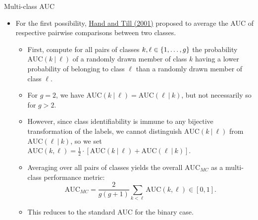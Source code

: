 \documentclass[11pt,compress,t,notes=noshow, xcolor=table]{beamer}
\begin{document}
\begin{vbframe}{Multi-class AUC}
\framebreak
  
\begin{itemize}  
  \small
  \item For the first possibility, 
  \href{https://link.springer.com/article/10.1023/A:1010920819831}
  {Hand and Till (2001)} proposed to average the AUC of respective pairwise 
  comparisons between two classes.
  \begin{itemize}
    \small
    \item First, compute for all pairs of classes $k, \ell \in \{1, \ldots, g\}$ the 
    probability $\text{AUC}(k ~|~ \ell)$ of a randomly drawn member of class $k$ 
    having a lower probability of belonging to class $\ell$ than a randomly drawn 
    member of class $\ell$.
    \item For $g = 2$, we have $\text{AUC}(k ~|~ \ell) = 
    \text{AUC}(\ell ~|~ k)$, but not necessarily so for $g > 2$.
    \item However, since class identifiability is immune to any bijective 
    transformation of the labels, we cannot distinguish $\text{AUC}(k ~|~ \ell)$ 
    from $\text{AUC}(\ell ~|~ k)$, so we set 
    $\text{AUC}(k, \ell) = \frac{1}{2} \cdot [\text{AUC}(k ~|~ \ell) + 
    \text{AUC}(\ell ~|~ k)]$.
  
  
    \item Averaging over all pairs of classes yields the overall 
    $\text{AUC}_{MC}$ as a multi-class performance metric:
    $$\text{AUC}_{MC} = \frac{2}{g(g + 1)} \sum_{k < \ell} \text{AUC}(k, \ell) 
    \in [0, 1].$$
    \item This reduces to the standard AUC for the binary case.
  \end{itemize}
\end{itemize}
\end{vbframe}


\endlecture
\end{document}
